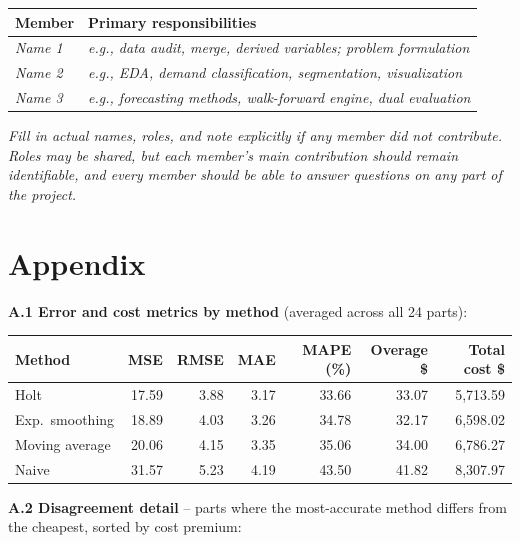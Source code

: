 \documentclass[12pt]{article}
\begin{document}
\begin{center}
\begin{tabular}{@{}p{3.2cm}p{10.5cm}@{}}
\toprule
\textbf{Member} & \textbf{Primary responsibilities} \\
\midrule
\textit{Name 1} & \textit{e.g., data audit, merge, derived variables; problem formulation} \\
\textit{Name 2} & \textit{e.g., EDA, demand classification, segmentation, visualization} \\
\textit{Name 3} & \textit{e.g., forecasting methods, walk-forward engine, dual evaluation} \\
\bottomrule
\end{tabular}
\end{center}

\textit{Fill in actual names, roles, and note explicitly if any member did not contribute.
Roles may be shared, but each member's main contribution should remain identifiable, and every
member should be able to answer questions on any part of the project.}

\clearpage
\section*{Appendix}

\textbf{A.1 Error and cost metrics by method} (averaged across all 24 parts):

\begin{center}
\begin{tabular}{@{}lrrrrrr@{}}
\toprule
\textbf{Method} & \textbf{MSE} & \textbf{RMSE} & \textbf{MAE} & \textbf{MAPE (\%)} & \textbf{Overage \$} & \textbf{Total cost \$} \\
\midrule
Holt            & 17.59 & 3.88 & 3.17 & 33.66 & 33.07 & 5{,}713.59 \\
Exp.\ smoothing & 18.89 & 4.03 & 3.26 & 34.78 & 32.17 & 6{,}598.02 \\
Moving average  & 20.06 & 4.15 & 3.35 & 35.06 & 34.00 & 6{,}786.27 \\
Naive           & 31.57 & 5.23 & 4.19 & 43.50 & 41.82 & 8{,}307.97 \\
\bottomrule
\end{tabular}
\end{center}

\textbf{A.2 Disagreement detail} -- parts where the most-accurate method differs from the
cheapest, sorted by cost premium:
\end{document}
